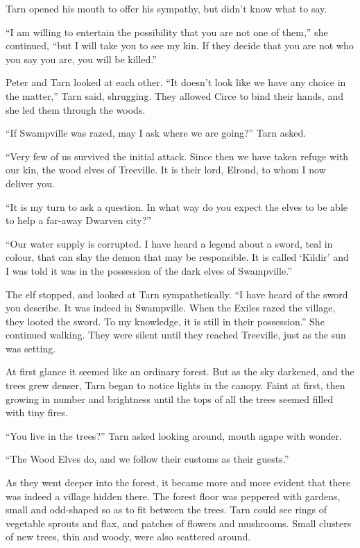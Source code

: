 Tarn opened his mouth to offer his sympathy, but didn't know what to say.

``I am willing to entertain the possibility that you are not one of them,'' she continued, ``but I will take you to see my kin.  If they decide that you are not who you say you are, you will be killed.''

Peter and Tarn looked at each other.  ``It doesn't look like we have any choice in the matter,'' Tarn said, shrugging.  They allowed Circe to bind their hands, and she led them through the woods.

``If Swampville was razed, may I ask where we are going?'' Tarn asked.

``Very few of us survived the initial attack.  Since then we have taken refuge with our kin, the wood elves of Treeville.  It is their lord, Elrond, to whom I now deliver you.

``It is my turn to ask a question.  In what way do you expect the elves to be able to help a far-away Dwarven city?''

``Our water supply is corrupted.  I have heard a legend about a sword, teal in colour, that can slay the demon that may be responsible.  It is called `K\=\i{}ldir' and I was told it was in the possession of the dark elves of Swampville.''

The elf stopped, and looked at Tarn sympathetically.  ``I have heard of the sword you describe.  It was indeed in Swampville.  When the Exiles razed the village, they looted the sword.  To my knowledge, it is still in their possession.''  She continued walking.  They were silent until they reached Treeville, just as the sun was setting.

At first glance it seemed like an ordinary forest.  But as the sky darkened, and the trees grew denser, Tarn began to notice lights in the canopy.  Faint at first, then growing in number and brightness until the tops of all the trees seemed filled with tiny fires.

``You live in the trees?'' Tarn asked looking around, mouth agape with wonder.

``The Wood Elves do, and we follow their customs as their guests.''

As they went deeper into the forest, it became more and more evident that there was indeed a village hidden there.  The forest floor was peppered with gardens, small and odd-shaped so as to fit between the trees.  Tarn could see rings of vegetable sprouts and flax, and patches of flowers and mushrooms.  Small clusters of new trees, thin and woody, were also scattered around.

